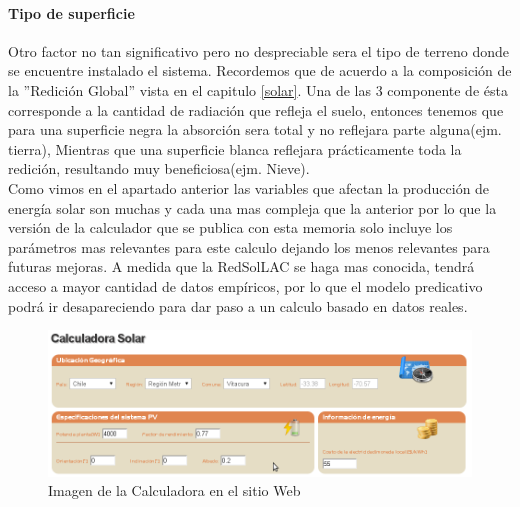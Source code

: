 \paragraph{Tipo de superficie}
Otro factor no tan significativo pero no despreciable sera el tipo de terreno donde se encuentre instalado el sistema. Recordemos que de acuerdo a la composición de la ''Redición Global'' vista en el capitulo \ref{solar}. Una de las 3 componente de ésta corresponde a la cantidad de radiación que refleja el suelo, entonces tenemos que para una superficie negra la absorción sera total y no reflejara parte alguna(ejm. tierra), Mientras que una superficie blanca reflejara prácticamente toda la redición, resultando muy beneficiosa(ejm. Nieve).\\

Como vimos en el apartado anterior las variables que afectan la producción de energía solar son muchas y cada una mas compleja que la anterior por lo que la versión de la calculador que se publica con esta memoria solo incluye los parámetros mas relevantes para este calculo dejando los menos relevantes para futuras mejoras. A medida que la RedSolLAC se haga mas conocida, tendrá acceso a mayor cantidad de datos empíricos, por lo que el modelo predicativo podrá ir desapareciendo para dar paso a un calculo basado en datos reales.\\

\begin{figure}[h!]
        \centering
        \includegraphics[scale=0.4]{images/calculadoraFoto1}
        \caption{Imagen de la Calculadora en el sitio Web}
        \label{solarCalcFoto1}
\end{figure}

